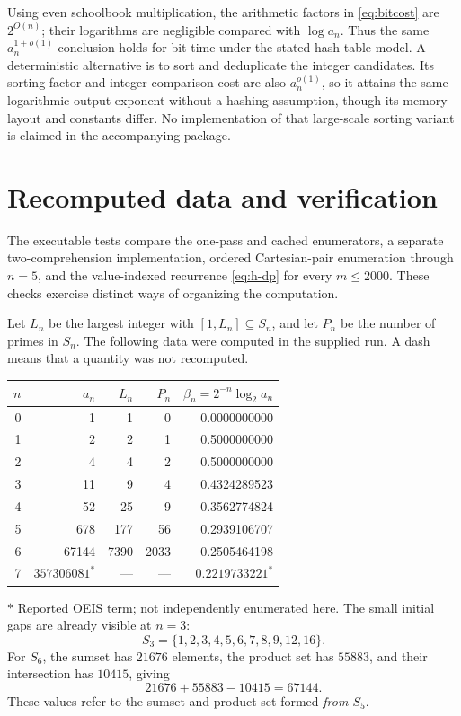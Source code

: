 \documentclass[11pt,a4paper]{article}
\theoremstyle{definition}
\theoremstyle{remark}
\renewcommand{\lg}{\log_2}
\begin{document}
Using even schoolbook multiplication, the arithmetic factors in
\eqref{eq:bitcost} are $2^{O(n)}$; their logarithms are negligible compared
with $\log a_n$. Thus the same $a_n^{1+o(1)}$ conclusion holds for bit time
under the stated hash-table model. A deterministic alternative is to
sort and deduplicate the integer candidates. Its sorting factor and
integer-comparison cost are also $a_n^{o(1)}$, so it attains the same
logarithmic output exponent without a hashing assumption, though its
memory layout and constants differ. No implementation of that large-scale
sorting variant is claimed in the accompanying package.

\section{Recomputed data and verification}\label{sec:verification}
The executable tests compare the one-pass and cached enumerators, a
separate two-comprehension implementation, ordered Cartesian-pair
enumeration through $n=5$, and the value-indexed recurrence
\eqref{eq:h-dp} for every $m\le2000$. These checks exercise distinct ways
of organizing the computation.

Let $L_n$ be the largest integer with $[1,L_n]\subseteq S_n$, and let $P_n$
be the number of primes in $S_n$. The following data were computed in the
supplied run. A dash means that a quantity was not recomputed.
\begin{center}
\begin{tabular}{r r r r r}
\toprule
$n$ & $a_n$ & $L_n$ & $P_n$ & $\beta_n=2^{-n}\lg a_n$\\
\midrule
0 & 1 & 1 & 0 & 0.0000000000\\
1 & 2 & 2 & 1 & 0.5000000000\\
2 & 4 & 4 & 2 & 0.5000000000\\
3 & 11 & 9 & 4 & 0.4324289523\\
4 & 52 & 25 & 9 & 0.3562774824\\
5 & 678 & 177 & 56 & 0.2939106707\\
6 & 67144 & 7390 & 2033 & 0.2505464198\\
7 & $357306081^{\ast}$ & --- & --- & $0.2219733221^{\ast}$\\
\bottomrule
\end{tabular}
\end{center}
\noindent $\ast$ Reported OEIS term; not independently enumerated here.
The small initial gaps are already visible at $n=3$:
\[
 S_3=\{1,2,3,4,5,6,7,8,9,12,16\}.
\]
For $S_6$, the sumset has $21676$ elements, the product set has $55883$,
and their intersection has $10415$, giving
\[
 21676+55883-10415=67144.
\]
These values refer to the sumset and product set formed \emph{from $S_5$}.
\end{document}
